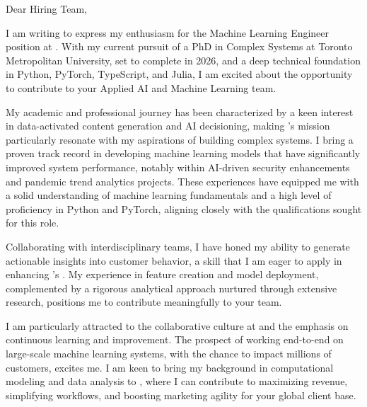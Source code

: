 Dear \company{} Hiring Team,
\vspace{1.0em}

\hspace{1.5em} I am writing to express my enthusiasm for the Machine Learning Engineer position at \company. With my current pursuit of a PhD in Complex Systems at Toronto Metropolitan University, set to complete in 2026, and a deep technical foundation in Python, PyTorch, TypeScript, and Julia, I am excited about the opportunity to contribute to your Applied AI and Machine Learning team.
\vspace{1.0em}

\hspace{1.5em} My academic and professional journey has been characterized by a keen interest in data-activated content generation and AI decisioning, making \company’s mission particularly resonate with my aspirations of building complex systems. I bring a proven track record in developing machine learning models that have significantly improved system performance, notably within AI-driven security enhancements and pandemic trend analytics projects. These experiences have equipped me with a solid understanding of machine learning fundamentals and a high level of proficiency in Python and PyTorch, aligning closely with the qualifications sought for this role.
\vspace{1.0em}

\hspace{1.5em} Collaborating with interdisciplinary teams, I have honed my ability to generate actionable insights into customer behavior, a skill that I am eager to apply in enhancing \company’s \product. My experience in feature creation and model deployment, complemented by a rigorous analytical approach nurtured through extensive research, positions me to contribute meaningfully to your team.
\vspace{1.0em}

\hspace{1.5em} I am particularly attracted to the collaborative culture at \company{} and the emphasis on continuous learning and improvement. The prospect of working end-to-end on large-scale machine learning systems, with the chance to impact millions of customers, excites me. I am keen to bring my background in computational modeling and data analysis to \company, where I can contribute to maximizing revenue, simplifying workflows, and boosting marketing agility for your global client base.
\vspace{1.0em}

